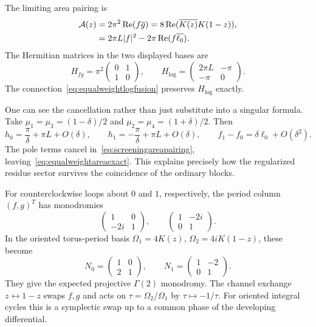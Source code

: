 \documentclass[11pt,a4paper]{article}
\numberwithin{equation}{section}
\theoremstyle{definition}
\theoremstyle{remark}
\begin{document}
The limiting area pairing is
\begin{align}
 \mathcal A(z)
   &=2\pi^2\operatorname{Re}(f\overline g)
     =8\operatorname{Re}(\overline{K(z)}K(1-z)),
       \label{eq:equalweightareaexact}\\
   &=2\pi L|f|^2-2\pi\operatorname{Re}(f\overline{\ell_0}).
       \notag
\end{align}
The Hermitian matrices in the two displayed bases are
\begin{equation}
 H_{fg}=\pi^2\begin{pmatrix}0&1\\1&0\end{pmatrix},\qquad
 H_{\log}=\begin{pmatrix}2\pi L&-\pi\\-\pi&0\end{pmatrix}.
 \label{eq:equalweightHermitian}
\end{equation}
The connection~\eqref{eq:equalweightlogfusion} preserves
$H_{\log}$ exactly.

One can see the cancellation rather than just substitute
into a singular formula. Take
$\mu_1=\mu_3=(1-\delta)/2$ and
$\mu_2=\mu_4=(1+\delta)/2$. Then
\[
 h_0=\frac\pi\delta+\pi L+O(\delta),\qquad
 h_1=-\frac\pi\delta+\pi L+O(\delta),\qquad
 f_1-f_0=\delta\ell_0+O(\delta^2).
\]
The pole terms cancel in~\eqref{eq:screeningareapairing},
leaving~\eqref{eq:equalweightareaexact}. This explains
precisely how the regularized residue sector survives the
coincidence of the ordinary blocks.

For counterclockwise loops about $0$ and $1$, respectively,
the period column $(f,g)^T$ has monodromies
\[
 \begin{pmatrix}1&0\\-2i&1\end{pmatrix},\qquad
 \begin{pmatrix}1&-2i\\0&1\end{pmatrix}.
\]
In the oriented torus-period basis
$\Omega_1=4K(z)$, $\Omega_2=4iK(1-z)$, these become
\begin{equation}
 N_0=\begin{pmatrix}1&0\\2&1\end{pmatrix},\qquad
 N_1=\begin{pmatrix}1&-2\\0&1\end{pmatrix}.
 \label{eq:equalweightmonodromy}
\end{equation}
They give the expected projective $\Gamma(2)$ monodromy.
The channel exchange $z\leftrightarrow1-z$ swaps $f,g$ and
acts on $\tau=\Omega_2/\Omega_1$ by $\tau\mapsto-1/\tau$.
For oriented integral cycles this is a symplectic swap up
to a common phase of the developing differential.
\end{document}
